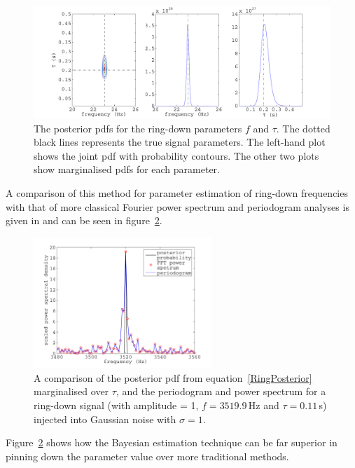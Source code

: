 \begin{figure}[!htbp]
\begin{center}
\includegraphics[width=1.0\textwidth]{figs/ringPosterior}\caption[The posterior pdfs
for the ring-down parameters $f$ and $\tau$.]{The posterior pdfs for the ring-down parameters $f$
and $\tau$. The dotted black lines represents the true signal parameters. The left-hand plot shows
the joint pdf with probability contours. The other two plots show marginalised pdfs for each
parameter.}\label{ringPosterior}
\end{center}
\end{figure}
A comparison of this method for parameter estimation of ring-down frequencies with that of more
classical Fourier power spectrum and periodogram analyses is given in \cite{Bretthorst:1988} and can
be seen in figure~\ref{BayesVsFFT}.
\begin{figure}[!htbp]
\begin{center}
\includegraphics[width=0.6\textwidth]{figs/BayesVsFFT}\caption[A comparison of the posterior pdf,
with a periodogram and power sepctrum for a ring-down signal.]{A comparison of the posterior pdf
from equation~\ref{RingPosterior} marginalised over $\tau$, and the periodogram and power spectrum
for a ring-down signal (with amplitude = 1, $f=3519.9$\,Hz and $\tau = 0.11$\,s) injected into
Gaussian noise with $\sigma = 1$.}\label{BayesVsFFT}
\end{center}
\end{figure}
Figure~\ref{BayesVsFFT} shows how the Bayesian estimation technique can be far superior in pinning
down the parameter value over more traditional methods.

